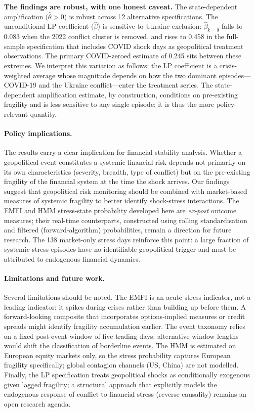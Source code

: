\documentclass[11pt]{article}
\begin{document}
\textbf{The findings are robust, with one honest caveat.} The state-dependent
amplification ($\hat\theta > 0$) is robust across 12 alternative specifications.
The unconditional LP coefficient ($\hat\beta$) is sensitive to Ukraine exclusion:
$\hat\beta_{k=0}$ falls to 0.083 when the 2022 conflict cluster is removed,
and rises to 0.458 in the full-sample specification that includes COVID shock days
as geopolitical treatment observations. The primary COVID-zeroed estimate of 0.245
sits between these extremes. We interpret this variation as follows: the LP
coefficient is a crisis-weighted average whose magnitude depends on how the two
dominant episodes---COVID-19 and the Ukraine conflict---enter the treatment series.
The state-dependent amplification estimate, by construction, conditions on
pre-existing fragility and is less sensitive to any single episode; it is thus
the more policy-relevant quantity.

\paragraph{Policy implications.}
The results carry a clear implication for financial stability analysis. Whether
a geopolitical event constitutes a systemic financial risk depends not primarily on
its own characteristics (severity, breadth, type of conflict) but on the pre-existing
fragility of the financial system at the time the shock arrives.
Our findings suggest that geopolitical risk monitoring should be combined with
market-based measures of systemic fragility to better identify shock-stress
interactions. The EMFI and HMM stress-state probability developed here are
\emph{ex-post} outcome measures; their real-time counterparts, constructed
using rolling standardisation and filtered (forward-algorithm) probabilities,
remain a direction for future research.
The 138 market-only stress days reinforce this point: a large fraction of
systemic stress episodes have no identifiable geopolitical trigger and must be
attributed to endogenous financial dynamics.

\paragraph{Limitations and future work.}
Several limitations should be noted. The EMFI is an acute-stress indicator, not
a leading indicator: it spikes during crises rather than building up before them.
A forward-looking composite that incorporates options-implied measures or credit
spreads might identify fragility accumulation earlier. The event taxonomy relies
on a fixed post-event window of five trading days; alternative window lengths
would shift the classification of borderline events. The HMM is estimated on
European equity markets only, so the stress probability captures European fragility
specifically; global contagion channels (US, China) are not modelled. Finally,
the LP specification treats geopolitical shocks as conditionally exogenous given
lagged fragility; a structural approach that explicitly models the endogenous
response of conflict to financial stress (reverse causality) remains an open
research agenda.
\end{document}
